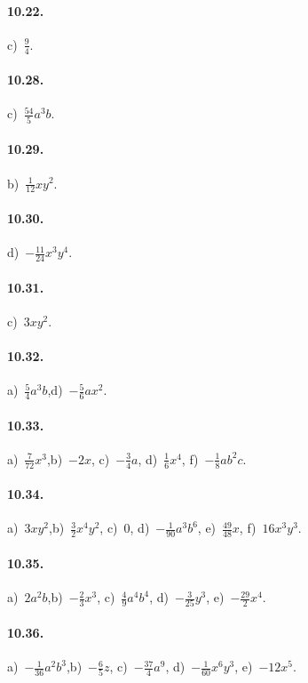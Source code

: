 \begin{multicols}{3}
\paragraph{10.22.} c)~$\frac{9}{4}$.
\paragraph{10.28.} c)~$\frac{54}{5}a^{3}b$.
\paragraph{10.29.} b)~$\frac{1}{12}xy^{2}$.
\paragraph{10.30.} d)~$-\frac{11}{24}x^{3}y^{4}$.
\paragraph{10.31.} c)~$3xy^{2}$.
\paragraph{10.32.} a)~$\frac{5}{4}a^{3}b$,\quad d)~$-\frac{5}{6}ax^{2}$.
\end{multicols}

\paragraph{10.33.} a)~$\frac{7}{72}x^{3}$,\quad b)~$-2x$, \quad c)~$-\frac{3}{4}a$, \quad d)~$\frac{1}{6}x^{4}$, \quad f)~$-\frac{1}{8}ab^{2}c$.

\paragraph{10.34.} a)~$3xy^{2}$,\quad b)~$\frac{3}{2}x^{4}y^{2}$, \quad c)~0, \quad d)~$-\frac{1}{90}a^{3}b^{6}$, \quad e)~$\frac{49}{48}x$, \quad f)~$16x^{3}y^{3}$.

\paragraph{10.35.} a)~$2a^{2}b$,\quad b)~$-\frac{2}{3}x^{3}$, \quad c)~$\frac{4}{9}a^{4}b^{4}$, \quad d)~$-\frac{3}{25}y^{3}$, \quad e)~$-\frac{29}{2}x^{4}$.

\paragraph{10.36.} a)~$-\frac{1}{36}a^{2}b^{3}$,\quad b)~$-\frac{6}{5}z$, \quad c)~$-\frac{37}{4}a^{9}$, \quad d)~$-\frac{1}{60}x^{6}y^{3}$, \quad e)~$-12x^{5}$.

